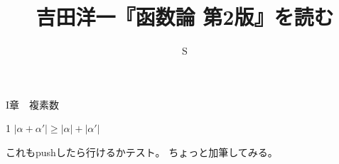 \documentclass{article}
\title{吉田洋一『函数論 第2版』を読む}
\author{S}
\begin{document}
\maketitle
I章　複素数

1 $|\alpha+\alpha'|\ge|\alpha|+|\alpha'|$

これもpushしたら行けるかテスト。
ちょっと加筆してみる。
\end{document}
